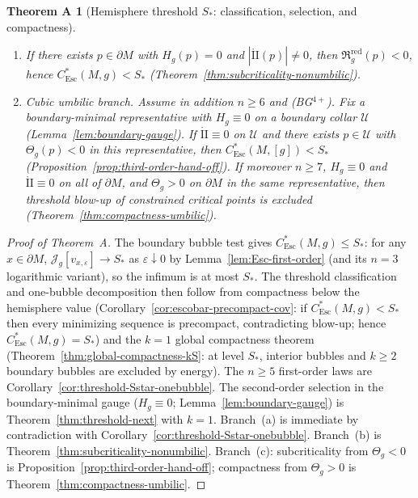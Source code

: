 \documentclass[11pt,reqno,a4paper]{amsart}
\numberwithin{equation}{section}
\theoremstyle{plain}
\newcommand{\Esc}{\ensuremath{\mathrm{Esc}}}
\theoremstyle{remark}
\theoremstyle{plain}
\newtheorem*{thmA}{Theorem A}
\begin{document}
\begin{thmA}[Hemisphere threshold $S_\ast$: classification, selection, and compactness]
\begin{enumerate}[label=\textup{(\alph*)},leftmargin=1.5em]
\item
If there exists $p\in\partial M$ with $H_g(p)=0$ and $|\mathring{\mathrm{II}}(p)|\neq0$, then
$\mathfrak R_g^{\mathrm{red}}(p)<0$, hence $C^*_{\Esc}(M,g)<S_\ast$
\textup{(Theorem~\ref{thm:subcriticality-nonumbilic})}.

\item
\emph{Cubic umbilic branch.}
Assume in addition $n\ge6$ and \textup{(BG$^{4+}$)}.
Fix a boundary-minimal representative with $H_g\equiv0$ on a boundary collar
$\mathcal U$ (Lemma~\ref{lem:boundary-gauge}).
If $\mathring{\mathrm{II}}\equiv0$ on $\mathcal U$ and there exists
$p\in\mathcal U$ with $\Theta_g(p)<0$ in this representative, then
$C^*_{\Esc}(M,[g])<S_\ast$
\textup{(Proposition~\ref{prop:third-order-hand-off})}.
If moreover $n\ge7$, $H_g\equiv0$ and
$\mathring{\mathrm{II}}\equiv0$ on all of $\partial M$,
and $\Theta_g>0$ on $\partial M$ in the same representative,
then threshold blow-up of constrained critical points is excluded
\textup{(Theorem~\ref{thm:compactness-umbilic})}.
\end{enumerate}
\end{thmA}

\begin{proof}[Proof of Theorem~A]
The boundary bubble test gives $C^*_{\Esc}(M,g)\le S_\ast$: for any $x\in\partial M$,
$\mathcal J_g[v_{x,\varepsilon}]\to S_\ast$ as $\varepsilon\downarrow0$ by
Lemma~\ref{lem:Esc-first-order} (and its $n=3$ logarithmic variant), so the infimum
is at most $S_\ast$.
The threshold classification and one-bubble decomposition then follow from
compactness below the hemisphere value
(Corollary~\ref{cor:escobar-precompact-cov}: if $C^*_{\Esc}(M,g)<S_\ast$
then every minimizing sequence is precompact, contradicting blow-up;
hence $C^*_{\Esc}(M,g)=S_\ast$)
and the $k=1$ global compactness theorem
(Theorem~\ref{thm:global-compactness-kS}: at level $S_\ast$, interior
bubbles and $k\ge2$ boundary bubbles are excluded by energy).
The $n\ge5$ first-order laws are
Corollary~\ref{cor:threshold-Sstar-onebubble}.
The second-order selection in the boundary-minimal gauge ($H_g\equiv0$; Lemma~\ref{lem:boundary-gauge}) is
Theorem~\ref{thm:threshold-next} with $k=1$.
Branch~(a) is immediate by contradiction with
Corollary~\ref{cor:threshold-Sstar-onebubble}.
Branch~(b) is Theorem~\ref{thm:subcriticality-nonumbilic}.
Branch~(c): subcriticality from $\Theta_g<0$ is
Proposition~\ref{prop:third-order-hand-off};
compactness from $\Theta_g>0$ is
Theorem~\ref{thm:compactness-umbilic}.
\end{proof}
\end{document}
